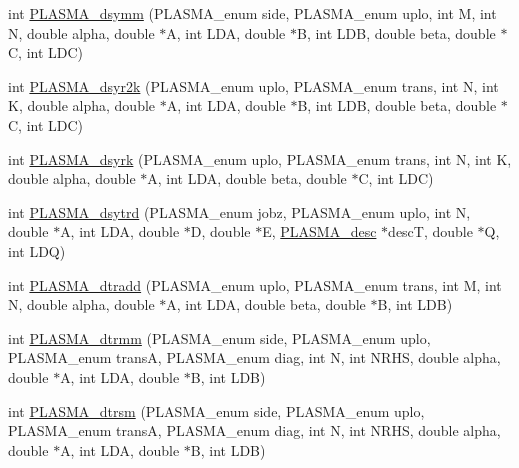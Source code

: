 \begin{DoxyCompactItemize}
int \hyperlink{group__double_ga1ab6ee29131efe4804f5ff940eeb699a_ga1ab6ee29131efe4804f5ff940eeb699a}{P\+L\+A\+S\+M\+A\+\_\+dsymm} (P\+L\+A\+S\+M\+A\+\_\+enum side, P\+L\+A\+S\+M\+A\+\_\+enum uplo, int M, int N, double alpha, double $\ast$A, int L\+D\+A, double $\ast$B, int L\+D\+B, double beta, double $\ast$C, int L\+D\+C)
\item 
int \hyperlink{group__double_gaf9fa0e62110092a132cd17d8f48561f0_gaf9fa0e62110092a132cd17d8f48561f0}{P\+L\+A\+S\+M\+A\+\_\+dsyr2k} (P\+L\+A\+S\+M\+A\+\_\+enum uplo, P\+L\+A\+S\+M\+A\+\_\+enum trans, int N, int K, double alpha, double $\ast$A, int L\+D\+A, double $\ast$B, int L\+D\+B, double beta, double $\ast$C, int L\+D\+C)
\item 
int \hyperlink{group__double_gacfdac462cfb1b2d6696e353bec9fd079_gacfdac462cfb1b2d6696e353bec9fd079}{P\+L\+A\+S\+M\+A\+\_\+dsyrk} (P\+L\+A\+S\+M\+A\+\_\+enum uplo, P\+L\+A\+S\+M\+A\+\_\+enum trans, int N, int K, double alpha, double $\ast$A, int L\+D\+A, double beta, double $\ast$C, int L\+D\+C)
\item 
int \hyperlink{group__double_gaebb037c30606f77404ffef513f255d5c_gaebb037c30606f77404ffef513f255d5c}{P\+L\+A\+S\+M\+A\+\_\+dsytrd} (P\+L\+A\+S\+M\+A\+\_\+enum jobz, P\+L\+A\+S\+M\+A\+\_\+enum uplo, int N, double $\ast$A, int L\+D\+A, double $\ast$D, double $\ast$E, \hyperlink{structplasma__desc__t}{P\+L\+A\+S\+M\+A\+\_\+desc} $\ast$desc\+T, double $\ast$Q, int L\+D\+Q)
\item 
int \hyperlink{group__double_gaac3009e1ff5468b93a66e6fd21c2221a_gaac3009e1ff5468b93a66e6fd21c2221a}{P\+L\+A\+S\+M\+A\+\_\+dtradd} (P\+L\+A\+S\+M\+A\+\_\+enum uplo, P\+L\+A\+S\+M\+A\+\_\+enum trans, int M, int N, double alpha, double $\ast$A, int L\+D\+A, double beta, double $\ast$B, int L\+D\+B)
\item 
int \hyperlink{group__double_ga16876a8b4e9148ba2c8f4d37dca9eef4_ga16876a8b4e9148ba2c8f4d37dca9eef4}{P\+L\+A\+S\+M\+A\+\_\+dtrmm} (P\+L\+A\+S\+M\+A\+\_\+enum side, P\+L\+A\+S\+M\+A\+\_\+enum uplo, P\+L\+A\+S\+M\+A\+\_\+enum trans\+A, P\+L\+A\+S\+M\+A\+\_\+enum diag, int N, int N\+R\+H\+S, double alpha, double $\ast$A, int L\+D\+A, double $\ast$B, int L\+D\+B)
\item 
int \hyperlink{group__double_ga7dab3739b47f3f77f68cb6166638f507_ga7dab3739b47f3f77f68cb6166638f507}{P\+L\+A\+S\+M\+A\+\_\+dtrsm} (P\+L\+A\+S\+M\+A\+\_\+enum side, P\+L\+A\+S\+M\+A\+\_\+enum uplo, P\+L\+A\+S\+M\+A\+\_\+enum trans\+A, P\+L\+A\+S\+M\+A\+\_\+enum diag, int N, int N\+R\+H\+S, double alpha, double $\ast$A, int L\+D\+A, double $\ast$B, int L\+D\+B)

\end{DoxyCompactItemize}
